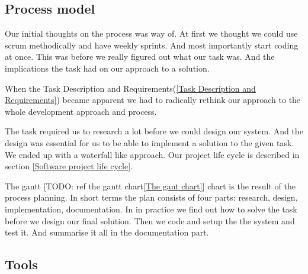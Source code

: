     \subsection{Process model}\label{Process model}
    Our initial thoughts on the process was way of. At first we thought we could use scrum methodically and have weekly sprints. And most importantly start coding at once. This was before we really figured out what our task was. And the implications the task had on our approach to a solution. 
    
    When the Task Description and Requirements(\ref{Task Description and Requirements}) became apparent we had to radically rethink our approach to the whole development approach and process. 
    
    The task required us to research a lot before we could design our system. And the design was essential for us to be able to implement a solution to the given task. We ended up with a waterfall like approach. Our project life cycle is described in section \ref{Software project life cycle}.
    
    The gantt [TODO: ref the gantt chart\ref{The gant chart}] chart is the result of the process planning. In short terms the plan consists of four parts: research, design, implementation, documentation. In in practice we find out how to solve the task before we design our final solution. Then we code and setup the the system and test it. And summarise it all in the documentation part.
    
    \subsection{Tools}\label{Tools}          
          
